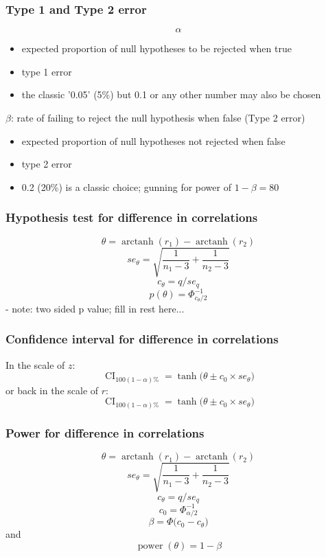 \documentclass{beamer}
\DeclareMathOperator\arctanh{arctanh}
\DeclareMathOperator\tanh{tanh}
\DeclareMathOperator\ci{CI}
\DeclareMathOperator\power{power}
\begin{document}
  \begin{frame}
    \frametitle{Type 1 and Type 2 error }  
    \[\alpha\]
    \begin{itemize}
      \item expected proportion of null hypotheses to be rejected when true 
      \item type 1 error
      \item the classic '0.05' (5\%)\; but 0.1 or any other number may also be chosen 
    \end{itemize}
    
    \(\beta\): rate of failing to reject the null hypothesis when false (Type 2 error)
    \begin{itemize}
      \item expected proportion of null hypotheses not rejected when false 
      \item type 2 error
      \item 0.2 (20\%) is a classic choice; gunning for power of \(1 - \beta = 80\)
    \end{itemize}
  \end{frame} 
  
  \begin{frame}
    \frametitle{Hypothesis test for difference in correlations  }
    \[\theta     = \arctanh(r_1) - \arctanh(r_2)          \]
    \[se_\theta  = \sqrt{\frac{1}{n_1-3}+\frac{1}{n_2-3}} \]
    \[c_\theta   = q / se_q                               \] 
    \[p(\theta)  =  \Phi_{c_\theta/2}^{-1}                \]
      - note: two sided p value; fill in rest here...
  \end{frame}   

  \begin{frame}
    \frametitle{Confidence interval for difference in correlations}  
    In the scale of \(z\):
    \[\ci_{100(1-\alpha)\%} =\tanh \bigg( \theta \pm c_0 \times se_\theta \bigg) \] 
    or back in the scale of \(r\):
    \[\ci_{100(1-\alpha)\%} =\tanh \bigg( \theta \pm c_0 \times se_\theta \bigg) \] 
  \end{frame}    
  
  \begin{frame}
    \frametitle{Power for difference in correlations }  
    \[\theta     = \arctanh(r_1) - \arctanh(r_2)            \]
    \[se_\theta    = \sqrt{\frac{1}{n_1-3}+\frac{1}{n_2-3}} \]
    \[c_\theta     = q / se_q                               \] 
    \[c_0   =  \Phi_{\alpha/2}^{-1}                         \]
    \[\beta = \Phi \bigg( c_0 - c_\theta \bigg)             \]
    and
    \[ \power(\theta) = 1 - \beta                           \]
  \end{frame}
  
\end{document}
